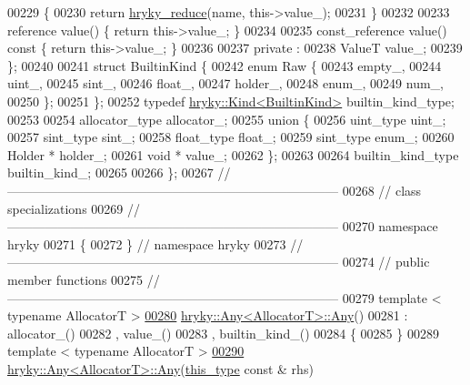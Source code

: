 \begin{DoxyCode}
00229         \{
00230             \textcolor{keywordflow}{return} \hyperlink{reduction__common_8h_afc72326c9900838c5db40438318794dd}{hryky_reduce}(name, this->value\_);
00231         \}
00232 
00233         reference value() \{ \textcolor{keywordflow}{return} this->value\_; \}
00234 
00235         const\_reference value()\textcolor{keyword}{ const }\{ \textcolor{keywordflow}{return} this->value\_; \}
00236         
00237     \textcolor{keyword}{private} :
00238         ValueT value\_;
00239     \};
00240 
00241     \textcolor{keyword}{struct }BuiltinKind \{
00242         \textcolor{keyword}{enum} Raw \{
00243             empty\_,
00244             uint\_,
00245             sint\_,
00246             float\_,
00247             holder\_,
00248             enum\_,
00249             num\_,
00250         \};
00251     \};
00252     \textcolor{keyword}{typedef} \hyperlink{classhryky_1_1_kind}{hryky::Kind<BuiltinKind>} builtin\_kind\_type;
00253 
00254     allocator\_type allocator\_;
00255     \textcolor{keyword}{union }\{
00256         uint\_type   uint\_;
00257         sint\_type   sint\_;
00258         float\_type  float\_;
00259         sint\_type   enum\_;
00260         Holder *    holder\_;
00261         \textcolor{keywordtype}{void} *      value\_;
00262     \};
00263 
00264     builtin\_kind\_type builtin\_kind\_;
00265 
00266 \};
00267 \textcolor{comment}{//
      ------------------------------------------------------------------------------}
00268 \textcolor{comment}{// class specializations}
00269 \textcolor{comment}{//
      ------------------------------------------------------------------------------}
00270 \textcolor{keyword}{namespace }hryky
00271 \{
00272 \} \textcolor{comment}{// namespace hryky}
00273 \textcolor{comment}{//
      ------------------------------------------------------------------------------}
00274 \textcolor{comment}{// public member functions}
00275 \textcolor{comment}{//
      ------------------------------------------------------------------------------}
00279 \textcolor{comment}{}\textcolor{keyword}{template} < \textcolor{keyword}{typename} AllocatorT >
\hypertarget{any_8h_source_l00280}{}\hyperlink{classhryky_1_1_any_a3d0d9135c798b3bfb4428fc04f168414}{00280} \hyperlink{classhryky_1_1_any_a3d0d9135c798b3bfb4428fc04f168414}{hryky::Any<AllocatorT>::Any}()
00281     : allocator\_()
00282       , value\_()
00283       , builtin\_kind\_()
00284 \{
00285 \}
00289 \textcolor{keyword}{template} < \textcolor{keyword}{typename} AllocatorT >
\hypertarget{any_8h_source_l00290}{}\hyperlink{classhryky_1_1_any_aa95b8ee5fd959cbcf14a63ba5fe40ab1}{00290} \hyperlink{classhryky_1_1_any}{hryky::Any<AllocatorT>::Any}(\hyperlink{classhryky_1_1_any}{this_type} \textcolor{keyword}{const} & rhs)

\end{DoxyCode}
